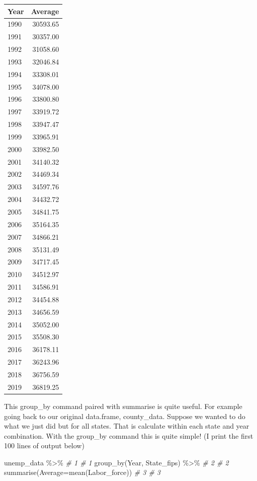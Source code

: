 \documentclass[
]{book}
\newenvironment{Shaded}{\begin{snugshade}}{\end{snugshade}}
\newcommand{\AttributeTok}[1]{\textcolor[rgb]{0.77,0.63,0.00}{#1}}
\newcommand{\CommentTok}[1]{\textcolor[rgb]{0.56,0.35,0.01}{\textit{#1}}}
\newcommand{\FunctionTok}[1]{\textcolor[rgb]{0.00,0.00,0.00}{#1}}
\newcommand{\NormalTok}[1]{#1}
\newcommand{\SpecialCharTok}[1]{\textcolor[rgb]{0.00,0.00,0.00}{#1}}
\begin{document}
\begin{tabular}{l|r}
\hline
Year & Average\\
\hline
1990 & 30593.65\\
\hline
1991 & 30357.00\\
\hline
1992 & 31058.60\\
\hline
1993 & 32046.84\\
\hline
1994 & 33308.01\\
\hline
1995 & 34078.00\\
\hline
1996 & 33800.80\\
\hline
1997 & 33919.72\\
\hline
1998 & 33947.47\\
\hline
1999 & 33965.91\\
\hline
2000 & 33982.50\\
\hline
2001 & 34140.32\\
\hline
2002 & 34469.34\\
\hline
2003 & 34597.76\\
\hline
2004 & 34432.72\\
\hline
2005 & 34841.75\\
\hline
2006 & 35164.35\\
\hline
2007 & 34866.21\\
\hline
2008 & 35131.49\\
\hline
2009 & 34717.45\\
\hline
2010 & 34512.97\\
\hline
2011 & 34586.91\\
\hline
2012 & 34454.88\\
\hline
2013 & 34656.59\\
\hline
2014 & 35052.00\\
\hline
2015 & 35508.30\\
\hline
2016 & 36178.11\\
\hline
2017 & 36243.96\\
\hline
2018 & 36756.59\\
\hline
2019 & 36819.25\\
\hline
\end{tabular}

This group\_by command paired with summarise is quite useful. For example going back to our original data.frame, county\_data. Suppose we wanted to do what we just did but for all states. That is calculate within each state and year combination. With the group\_by command this is quite simple! (I print the first 100 lines of output below)

\begin{Shaded}
\begin{Highlighting}[]
\NormalTok{unemp\_data }\SpecialCharTok{\%\textgreater{}\%}                          \CommentTok{\# 1  \# 1}
  \FunctionTok{group\_by}\NormalTok{(Year, State\_fips) }\SpecialCharTok{\%\textgreater{}\%}        \CommentTok{\# 2  \# 2}
  \FunctionTok{summarise}\NormalTok{(}\AttributeTok{Average=}\FunctionTok{mean}\NormalTok{(Labor\_force))  }\CommentTok{\# 3  \# 3}
\end{Highlighting}
\end{Shaded}
\end{document}
